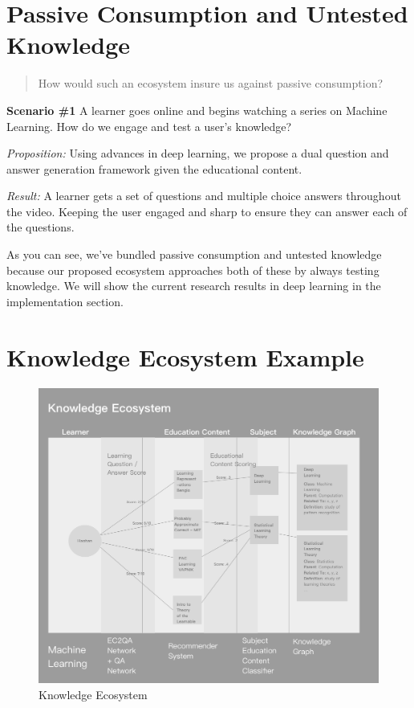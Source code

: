 \documentclass[]{book}
\theoremstyle{definition}
\theoremstyle{definition}
\theoremstyle{definition}
\theoremstyle{remark}
\begin{document}
\section{Passive Consumption and Untested
Knowledge}\label{passive-consumption-and-untested-knowledge}

\begin{quote}
How would such an ecosystem insure us against passive consumption?
\end{quote}

\textbf{Scenario \#1} A learner goes online and begins watching a series
on Machine Learning. How do we engage and test a user's knowledge?

\emph{Proposition:} Using advances in deep learning, we propose a dual
question and answer generation framework given the educational content.

\emph{Result:} A learner gets a set of questions and multiple choice
answers throughout the video. Keeping the user engaged and sharp to
ensure they can answer each of the questions.

As you can see, we've bundled passive consumption and untested knowledge
because our proposed ecosystem approaches both of these by always
testing knowledge. We will show the current research results in deep
learning in the implementation section.

\section{Knowledge Ecosystem Example}\label{knowledge-ecosystem-example}

\begin{figure}
\centering
\includegraphics{img/knowledgeEcosystem.png}
\caption{Knowledge Ecosystem}
\end{figure}
\end{document}
